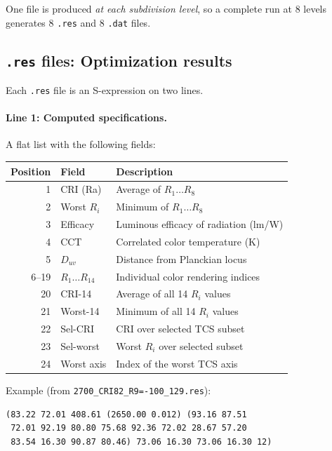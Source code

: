 \documentclass[11pt]{article}
\newcommand{\file}[1]{\texttt{#1}}
\begin{document}
One file is produced \emph{at each subdivision level}, so a complete run
at 8 levels generates 8 \file{.res} and 8 \file{.dat} files.

\subsection{\texttt{.res} files: Optimization results}

Each \file{.res} file is an S-expression on two lines.

\paragraph{Line 1: Computed specifications.}  A flat list with the
following fields:
\begin{center}
\begin{tabular}{@{}rll@{}}
\toprule
Position & Field & Description \\
\midrule
1  & CRI (Ra)    & Average of $R_1 \ldots R_8$ \\
2  & Worst $R_i$ & Minimum of $R_1 \ldots R_8$ \\
3  & Efficacy    & Luminous efficacy of radiation (lm/W) \\
4  & CCT         & Correlated color temperature (K) \\
5  & $D_{uv}$    & Distance from Planckian locus \\
6--19  & $R_1 \ldots R_{14}$ & Individual color rendering indices \\
20 & CRI-14      & Average of all 14 $R_i$ values \\
21 & Worst-14    & Minimum of all 14 $R_i$ values \\
22 & Sel-CRI     & CRI over selected TCS subset \\
23 & Sel-worst   & Worst $R_i$ over selected subset \\
24 & Worst axis  & Index of the worst TCS axis \\
\bottomrule
\end{tabular}
\end{center}

Example (from \file{2700\_CRI82\_R9=-100\_129.res}):

\begin{lstlisting}[style=output]
(83.22 72.01 408.61 (2650.00 0.012) (93.16 87.51
 72.01 92.19 80.80 75.68 92.36 72.02 28.67 57.20
 83.54 16.30 90.87 80.46) 73.06 16.30 73.06 16.30 12)
\end{lstlisting}
\end{document}

